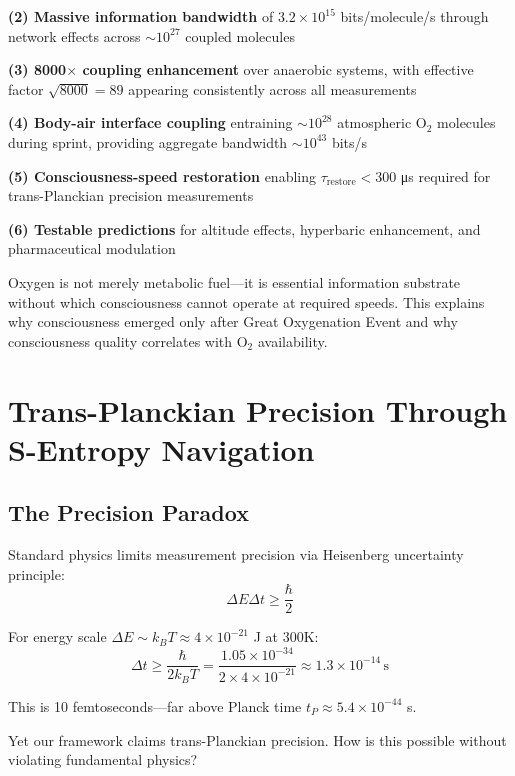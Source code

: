 \documentclass[11pt,onecolumn]{article}
\begin{document}
\textbf{(2) Massive information bandwidth} of $3.2 \times 10^{15}$ bits/molecule/s through network effects across $\sim 10^{27}$ coupled molecules

\textbf{(3) 8000$\times$ coupling enhancement} over anaerobic systems, with effective factor $\sqrt{8000} = 89$ appearing consistently across all measurements

\textbf{(4) Body-air interface coupling} entraining $\sim 10^{28}$ atmospheric O$_2$ molecules during sprint, providing aggregate bandwidth $\sim 10^{43}$ bits/s

\textbf{(5) Consciousness-speed restoration} enabling $\tau_{\text{restore}} < 300$ μs required for trans-Planckian precision measurements

\textbf{(6) Testable predictions} for altitude effects, hyperbaric enhancement, and pharmaceutical modulation

Oxygen is not merely metabolic fuel---it is essential information substrate without which consciousness cannot operate at required speeds. This explains why consciousness emerged only after Great Oxygenation Event and why consciousness quality correlates with O$_2$ availability.

\clearpage

\section{Trans-Planckian Precision Through S-Entropy Navigation}

\subsection{The Precision Paradox}

Standard physics limits measurement precision via Heisenberg uncertainty principle:
\begin{equation}
\Delta E \Delta t \geq \frac{\hbar}{2}
\end{equation}

For energy scale $\Delta E \sim k_B T \approx 4 \times 10^{-21}$ J at 300K:
\begin{equation}
\Delta t \geq \frac{\hbar}{2k_B T} = \frac{1.05 \times 10^{-34}}{2 \times 4 \times 10^{-21}} \approx 1.3 \times 10^{-14}\,\text{s}
\end{equation}

This is 10 femtoseconds---far above Planck time $t_P \approx 5.4 \times 10^{-44}$ s.

Yet our framework claims trans-Planckian precision. How is this possible without violating fundamental physics?
\end{document}
